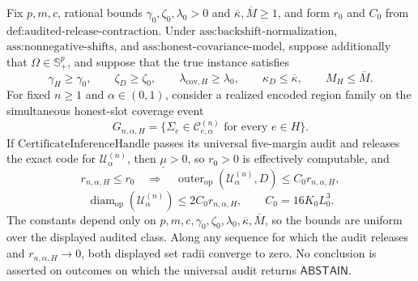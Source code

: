 Fix \(p,m,c\), rational bounds \(\gamma _0,\zeta _0,\lambda _0>0\) and \(\overline\kappa,\overline M\geq1\), and form \(r_0\) and \(C_0\) from \(\text{def:audited-release-contraction}\).  Under \(\text{ass:backshift-normalization}\), \(\text{ass:nonnegative-shifts}\), and \(\text{ass:honest-covariance-model}\), suppose additionally that \(\Omega\in\mathbb S_+^p\), and suppose that the true instance satisfies
\[
 \gamma_H\geq\gamma _0,\qquad
 \zeta_D\geq\zeta _0,\qquad
 \lambda_{\mathrm{cov},H}\geq\lambda _0,\qquad
 \kappa_D\leq\overline\kappa,\qquad
 M_H\leq\overline M.
\]
For fixed \(n\geq1\) and \(\alpha\in(0,1)\), consider a realized encoded region family on the simultaneous honest-slot coverage event
\[
 G_{n,\alpha,H}=\{\Sigma_e\in\mathcal C^{(n)}_{e,\alpha}\text{ for every }e\in H\}.
\]
If \(\text{CertificateInferenceHandle}\) passes its universal five-margin audit and releases the exact code for \(\mathcal U^{(n)}_\alpha\), then \(\underline\mu>0\), so \(r_0>0\) is effectively computable, and
\[
 r_{n,\alpha,H}\leq r_0
 \quad\Longrightarrow\quad
 \operatorname{outer}_{\mathrm{op}}(\mathcal U^{(n)}_\alpha,D)
 \leq C_0r_{n,\alpha,H},
\]
\[
 \operatorname{diam}_{\mathrm{op}}(\mathcal U^{(n)}_\alpha)
 \leq2C_0r_{n,\alpha,H},
 \qquad C_0=16K_0L_0^3.
\]
The constants depend only on \(p,m,c,\gamma _0,\zeta _0,\lambda _0,\overline\kappa,\overline M\), so the bounds are uniform over the displayed audited class.  Along any sequence for which the audit releases and \(r_{n,\alpha,H}\to0\), both displayed set radii converge to zero.  No conclusion is asserted on outcomes on which the universal audit returns \(\mathsf{ABSTAIN}\).